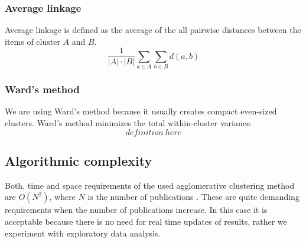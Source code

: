 \subsubsection{Average linkage}
Average linkage is defined as the average of the all pairwise 
distances between the items of cluster $A$ and $B$.
\begin{equation}
 \frac{1}{|A| \cdot |B|} \sum_{a \in A} \sum_{b \in B}d(a,b)
\end{equation}

\subsubsection{Ward's method}
We are using Ward's method because it usually creates compact 
even-sized clusters. \cite{ref_here} Ward's method minimizes the 
total within-cluster variance.
\begin{equation}
 definition\ here
\end{equation}



\subsection{Algorithmic complexity}
Both, time and space requirements of the used agglomerative clustering 
method are $O(N^2)$, where $N$ is the number of publications 
\cite{willett_recent_1988}. These are quite demanding requirements
when the number of publications increase. In this case it is 
acceptable because there is no need for real time updates of 
results, rather we experiment with exploratory data analysis.




